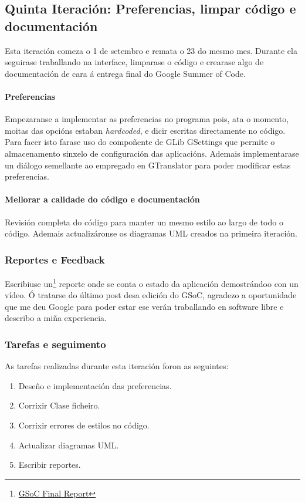 \subsection{Quinta Iteración: Preferencias, limpar código e documentación}
Esta iteración comeza o 1 de setembro e remata o 23 do mesmo mes. Durante ela seguirase traballando na interface, limparase o código e crearase algo de documentación de cara á entrega final do Google Summer of Code.

\paragraph{Preferencias}
Empezaranse a implementar as preferencias no programa pois, ata o momento, moitas das opcións estaban \emph{hardcoded}, e dicir escritas directamente no código. Para facer isto farase uso do compoñente de GLib GSettings que permite o almacenamento sinxelo de configuración das aplicacións. Ademais implementarase un diálogo semellante ao empregado en GTranslator para poder modificar estas preferencias.

\paragraph{Mellorar a calidade do código e documentación}
Revisión completa do código para manter un mesmo estilo ao largo de todo o código. Ademais actualizáronse os diagramas UML creados na primeira iteración.

\subsubsection{Reportes e Feedback}
Escribiuse un\footnote{\href{http://aquelando.info/gsoc-final-report/}{GSoC Final Report}} reporte onde se conta o estado da aplicación demostrándoo con un vídeo. Ó tratarse do último post desa edición do GSoC, agradezo a oportunidade que me deu Google para poder estar ese verán traballando en software libre e describo a miña experiencia.

\subsubsection{Tarefas e seguimento}

As tarefas realizadas durante esta iteración foron as seguintes:

\begin{enumerate}[label=\bfseries WBS 5.\arabic*]
  \item Deseño e implementación das preferencias.
  \item Corrixir Clase ficheiro.
  \item Corrixir errores de estilos no código.
  \item Actualizar diagramas UML.
  \item Escribir reportes.
\end {enumerate}

